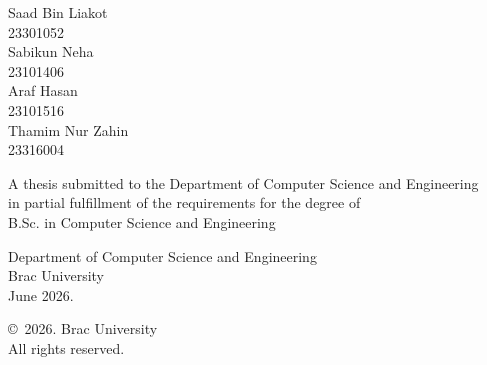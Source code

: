 \begin{titlepage}
\renewcommand*{\thepage}{Title} %

    \begin{center} 
        \vspace*{3cm} %
        
        {\fontsize{16pt}{22pt}\selectfont{Latent Regime Discovery in Black Hole Accretion Disks via Structural Invariance}
        } %
        
        \vspace{1.5cm}
        
        
        \vspace{0.5cm}
        
        	Saad Bin Liakot\\
	        23301052\\
	        Sabikun Neha\\
	        23101406\\
	        Araf Hasan\\
	        23101516\\
	        Thamim Nur Zahin\\
	        23316004

        \vspace{1.5cm}
        
        	A thesis submitted to the Department of Computer Science and Engineering\\
            in partial fulfillment of the requirements for the degree of\\
            B.Sc. in Computer Science and Engineering

        
        \vspace{2.5cm}
        
    		Department of Computer Science and Engineering\\
            Brac University\\
            June 2026.
        
        \vspace{3cm}
        
    \copyright\ 2026. Brac University\\
            All rights reserved.
    
    \end{center}

\end{titlepage}
